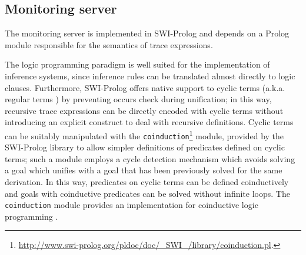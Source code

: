 

\subsection{Monitoring server}

The monitoring server is implemented in SWI-Prolog and depends on a Prolog module responsible for
the semantics of trace expressions.

The logic programming paradigm is well suited for the implementation of inference systems, since inference rules can be translated
almost directly to logic clauses.
Furthermore, SWI-Prolog offers native support to cyclic terms (a.k.a. regular terms \cite{Courcelle83}) by preventing occurs check during unification;
in this way, recursive trace expressions can be directly encoded with cyclic terms without introducing an explicit construct to deal with recursive
definitions.
Cyclic  terms can be suitably manipulated with the \lstinline{coinduction}\footnote{\url{http://www.swi-prolog.org/pldoc/doc/_SWI_/library/coinduction.pl}.}
module, provided by the SWI-Prolog library to allow simpler definitions of predicates defined on cyclic terms;
such a module employs a cycle detection mechanism which avoids solving a goal which unifies with a goal that has been previously solved
for the same derivation. In this way, predicates on cyclic terms can be defined coinductively and goals with coinductive predicates
can be solved without infinite loops. The  \lstinline{coinduction} module provides an implementation for
coinductive logic programming \cite{colp}.


